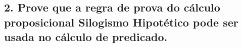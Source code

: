 \subsection*{2. Prove que a regra de prova do cálculo proposicional Silogismo Hipotético pode ser usada no cálculo de predicado.}
